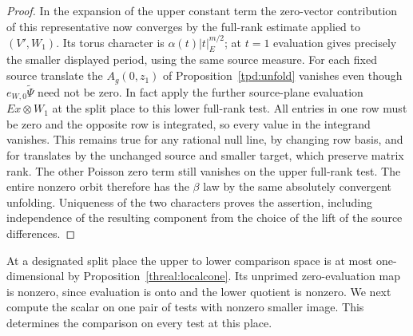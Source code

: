 \begin{proof}
In the expansion of the upper constant term the zero-vector
contribution of this representative now converges by the
full-rank estimate applied to \((V',W_1)\). Its torus character is
\(\alpha(t)|t|_E^{m/2}\); at \(t=1\) evaluation gives precisely
the smaller displayed period, using the same source measure.
For each fixed source translate the \(A_g(0,z_1)\) of
Proposition~\ref{tpd:unfold} vanishes even though
\(e_{W,0}\widetilde\Psi\) need not be zero. In fact apply the
further source-plane evaluation \(Ex\otimes W_1\) at the split
place to this lower full-rank test. All entries in one row must be
zero and the opposite row is integrated, so every value in the
integrand vanishes. This remains true for any rational null line,
by changing row basis, and for translates by the unchanged source
and smaller target, which preserve matrix rank. The other Poisson
zero term still vanishes on the upper full-rank test. The entire
nonzero orbit therefore has the \(\beta\) law by the same absolutely
convergent unfolding. Uniqueness of the two characters proves the
assertion, including independence of the resulting component from
the choice of the lift of the source differences.
\end{proof}

At a designated split place the upper to lower comparison space is
at most one-dimensional by Proposition~\ref{threal:localcone}.
Its unprimed zero-evaluation map is nonzero, since evaluation is
onto and the lower quotient is nonzero. We next compute the scalar
on one pair of tests with nonzero smaller image. This determines
the comparison on every test at this place.

